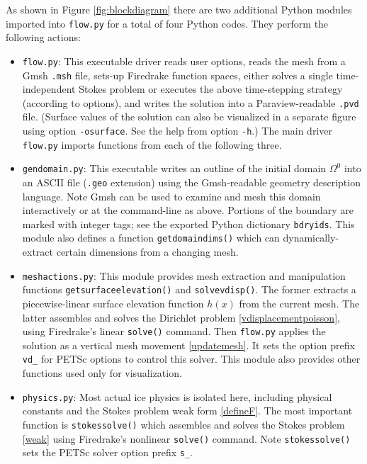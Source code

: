 \documentclass[letterpaper,final,12pt,reqno]{amsart}
\begin{document}
\medskip
As shown in Figure \ref{fig:blockdiagram} there are two additional Python modules imported into \texttt{flow.py} for a total of four Python codes.  They perform the following actions:
\begin{itemize}
\item \texttt{flow.py}: \quad  This executable driver reads user options, reads the mesh from a Gmsh \texttt{.msh} file, sets-up Firedrake function spaces, either solves a single time-independent Stokes problem or executes the above time-stepping strategy (according to options), and writes the solution into a Paraview-readable \texttt{.pvd} file.  (Surface values of the solution can also be visualized in a separate figure using option \texttt{-osurface}.  See the help from option \texttt{-h}.)  The main driver \texttt{flow.py} imports functions from each of the following three.

\item \texttt{gendomain.py}: \quad  This executable writes an outline of the initial domain $\Omega^0$ into an ASCII file (\texttt{.geo} extension) using the Gmsh-readable geometry description language.  Note Gmsh can be used to examine and mesh this domain interactively or at the command-line as above.  Portions of the boundary are marked with integer tags; see the exported Python dictionary \texttt{bdryids}.  This module also defines a function \texttt{getdomaindims()} which can dynamically-extract certain dimensions from a changing mesh.

\item \texttt{meshactions.py}: \quad  This module provides mesh extraction and manipulation functions \texttt{getsurfaceelevation()} and \texttt{solvevdisp()}.  The former extracts a piecewise-linear surface elevation function $h(x)$ from the current mesh.  The latter assembles and solves the Dirichlet problem \eqref{vdisplacementpoisson}, using Firedrake's linear \texttt{solve()} command.  Then \texttt{flow.py} applies the solution as a vertical mesh movement \eqref{updatemesh}.  It sets the option prefix \texttt{vd\_} for PETSc options to control this solver.  This module also provides other functions used only for visualization.

\item \texttt{physics.py}: \quad  Most actual ice physics is isolated here, including physical constants and the Stokes problem weak form \eqref{defineF}.  The most important function is \texttt{stokessolve()} which assembles and solves the Stokes problem \eqref{weak} using Firedrake's nonlinear \texttt{solve()} command.  Note \texttt{stokessolve()} sets the PETSc solver option prefix \texttt{s\_}.
\end{itemize}
\end{document}
